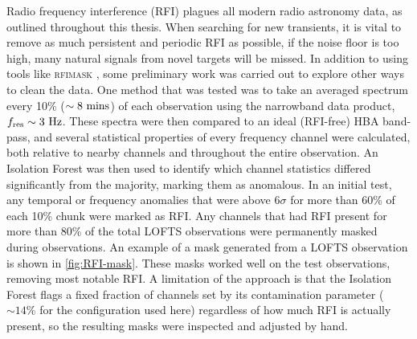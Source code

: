 

Radio frequency interference (RFI) plagues all modern radio astronomy data, as outlined throughout this thesis. When searching for new transients, it is vital to remove as much persistent and periodic RFI as possible, if the noise floor is too high, many natural signals from novel targets will be missed. In addition to using tools like \textsc{rfimask} \citep{ransom_new_2001}, some preliminary work was carried out to explore other ways to clean the data. One method that was tested was to take an averaged spectrum every 10\% ($\sim 8~\rm mins$) of each observation using the narrowband data product, $f_\text{res} \sim 3~\rm Hz$. These spectra were then compared to an ideal (RFI-free) HBA band-pass, and several statistical properties of every frequency channel were calculated, both relative to nearby channels and throughout the entire observation. An Isolation Forest was then used to identify which channel statistics differed significantly from the majority, marking them as anomalous. In an initial test, any temporal or frequency anomalies that were above $6\sigma$ for more than 60\% of each 10\% chunk were marked as RFI. Any channels that had RFI present for more than 80\% of the total LOFTS observations were permanently masked during observations. An example of a mask generated from a LOFTS observation is shown in \cref{fig:RFI-mask}. These masks worked well on the test observations, removing most notable RFI. A limitation of the approach is that the Isolation Forest flags a fixed fraction of channels set by its contamination parameter ($\sim 14\%$ for the configuration used here) regardless of how much RFI is actually present, so the resulting masks were inspected and adjusted by hand.

